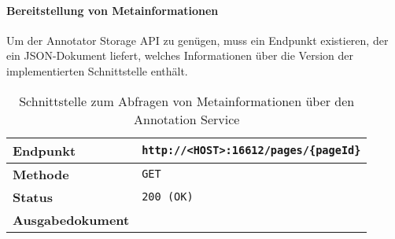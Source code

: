     \paragraph{Bereitstellung von Metainformationen}
    Um der Annotator Storage API zu genügen,
    muss ein Endpunkt existieren, der ein JSON-Dokument liefert,
    welches Informationen über die Version der implementierten Schnittstelle enthält.

    \begin{table}[htb]
        \centering
        \begin{tabular}{|l|l|}
            \hline
            \textbf{Endpunkt} & \texttt{http://<HOST>:16612/pages/\{pageId\}}\\
            \hline
            \textbf{Methode} & \texttt{GET}\\
            \hline
            \textbf{Status} & \texttt{200 (OK)}\\
            \hline
            \textbf{Ausgabedokument} & \\
            \hline
        \end{tabular}
        \caption{Schnittstelle zum Abfragen von Metainformationen über den Annotation Service}
        \label{my-label}
    \end{table}


    


